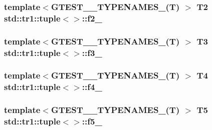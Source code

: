 \subsubsection[{\texorpdfstring{f2\+\_\+}{f2_}}]{\setlength{\rightskip}{0pt plus 5cm}template$<$G\+T\+E\+S\+T\+\_\+\_\+\+T\+Y\+P\+E\+N\+A\+M\+E\+S\+\_\+(\+T) $>$ T2 {\bf std\+::tr1\+::tuple}$<$$>$\+::f2\+\_\+}\hypertarget{classstd_1_1tr1_1_1tuple_aaec06c27366502dc332ef96878628f84}{}\label{classstd_1_1tr1_1_1tuple_aaec06c27366502dc332ef96878628f84}
\subsubsection[{\texorpdfstring{f3\+\_\+}{f3_}}]{\setlength{\rightskip}{0pt plus 5cm}template$<$G\+T\+E\+S\+T\+\_\+\_\+\+T\+Y\+P\+E\+N\+A\+M\+E\+S\+\_\+(\+T) $>$ T3 {\bf std\+::tr1\+::tuple}$<$$>$\+::f3\+\_\+}\hypertarget{classstd_1_1tr1_1_1tuple_ad4d3673e0d5c07c392c02e335fe978ff}{}\label{classstd_1_1tr1_1_1tuple_ad4d3673e0d5c07c392c02e335fe978ff}
\subsubsection[{\texorpdfstring{f4\+\_\+}{f4_}}]{\setlength{\rightskip}{0pt plus 5cm}template$<$G\+T\+E\+S\+T\+\_\+\_\+\+T\+Y\+P\+E\+N\+A\+M\+E\+S\+\_\+(\+T) $>$ T4 {\bf std\+::tr1\+::tuple}$<$$>$\+::f4\+\_\+}\hypertarget{classstd_1_1tr1_1_1tuple_ab662f1051c2302d065796383848db6c4}{}\label{classstd_1_1tr1_1_1tuple_ab662f1051c2302d065796383848db6c4}
\subsubsection[{\texorpdfstring{f5\+\_\+}{f5_}}]{\setlength{\rightskip}{0pt plus 5cm}template$<$G\+T\+E\+S\+T\+\_\+\_\+\+T\+Y\+P\+E\+N\+A\+M\+E\+S\+\_\+(\+T) $>$ T5 {\bf std\+::tr1\+::tuple}$<$$>$\+::f5\+\_\+}\hypertarget{classstd_1_1tr1_1_1tuple_a32d8cd6f180c0a77d83733fc65423657}{}\label{classstd_1_1tr1_1_1tuple_a32d8cd6f180c0a77d83733fc65423657}
